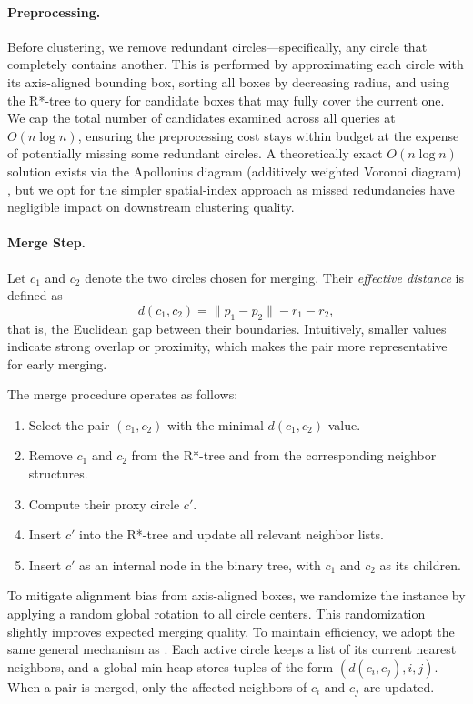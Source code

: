 \documentclass[11pt]{article}
\begin{document}
\paragraph{Preprocessing.}
Before clustering, we remove redundant circles---specifically, any circle that completely contains another. This is performed by approximating each circle with its axis-aligned bounding box, sorting all boxes by decreasing radius, and using the R*-tree to query for candidate boxes that may fully cover the current one. We cap the total number of candidates examined across all queries at $O(n \log n)$, ensuring the preprocessing cost stays within budget at the expense of potentially missing some redundant circles. A theoretically exact $O(n \log n)$ solution exists via the Apollonius diagram (additively weighted Voronoi diagram) \parencite{Karavelas2002}, but we opt for the simpler spatial-index approach as missed redundancies have negligible impact on downstream clustering quality.

\paragraph{Merge Step.}
Let $c_1$ and $c_2$ denote the two circles chosen for merging. Their \emph{effective distance} is defined as
\[
d(c_1, c_2) = \|p_1 - p_2\| - r_1 - r_2,
\]
that is, the Euclidean gap between their boundaries. Intuitively, smaller values indicate strong overlap or proximity, which makes the pair more representative for early merging.

The merge procedure operates as follows:
\begin{enumerate}
    \item Select the pair $(c_1, c_2)$ with the minimal $d(c_1, c_2)$ value.
    \item Remove $c_1$ and $c_2$ from the R*-tree and from the corresponding neighbor structures.
    \item Compute their proxy circle $c'$.
    \item Insert $c'$ into the R*-tree and update all relevant neighbor lists.
    \item Insert $c'$ as an internal node in the binary tree, with $c_1$ and $c_2$ as its children.
\end{enumerate}

To mitigate alignment bias from axis-aligned boxes, we randomize the instance by applying a random global rotation to all circle centers. This randomization slightly improves expected merging quality. To maintain efficiency, we adopt the same general mechanism as \textcite{Formella2024}. Each active circle keeps a list of its current nearest neighbors, and a global min-heap stores tuples of the form $(d(c_i, c_j), i, j)$. When a pair is merged, only the affected neighbors of $c_i$ and $c_j$ are updated.
\end{document}
